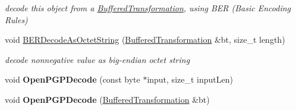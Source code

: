 \begin{DoxyCompactItemize}
\begin{DoxyCompactList}\small\item\em decode this object from a \hyperlink{class_buffered_transformation}{BufferedTransformation}, using BER (Basic Encoding Rules) \item\end{DoxyCompactList}\item 
\hypertarget{class_integer_a59f2e3f759fb252da8ce4bd718fb6487}{
void \hyperlink{class_integer_a59f2e3f759fb252da8ce4bd718fb6487}{BERDecodeAsOctetString} (\hyperlink{class_buffered_transformation}{BufferedTransformation} \&bt, size\_\-t length)}
\label{class_integer_a59f2e3f759fb252da8ce4bd718fb6487}

\begin{DoxyCompactList}\small\item\em decode nonnegative value as big-\/endian octet string \item\end{DoxyCompactList}\item 
\hypertarget{class_integer_a4b2415221b6eb9ffde8c9c495ae098f2}{
void {\bfseries OpenPGPDecode} (const byte $\ast$input, size\_\-t inputLen)}
\label{class_integer_a4b2415221b6eb9ffde8c9c495ae098f2}

\item 
\hypertarget{class_integer_a9ff99fc6723da5a45c98212de5cf4f3d}{
void {\bfseries OpenPGPDecode} (\hyperlink{class_buffered_transformation}{BufferedTransformation} \&bt)}
\label{class_integer_a9ff99fc6723da5a45c98212de5cf4f3d}

\end{DoxyCompactItemize}
